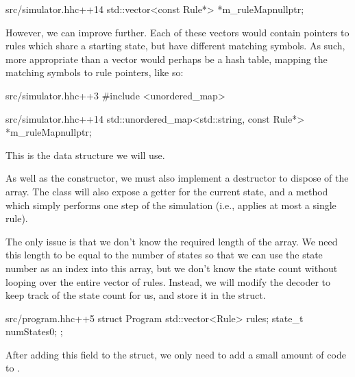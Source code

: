 \begin{file}{src/simulator.hh}{c++}{14}
    std::vector<const Rule*> *m_ruleMap{nullptr};
\end{file}

However, we can improve further. Each of these vectors would contain pointers to rules which share a starting state, but have different matching symbols. As such, more appropriate than a vector would perhaps be a hash table, mapping the matching symbols to rule pointers, like so:

\begin{file}{src/simulator.hh}{c++}{3}
#include <unordered_map>
\end{file}

\begin{file}{src/simulator.hh}{c++}{14}
    std::unordered_map<std::string, const Rule*> *m_ruleMap{nullptr};
\end{file}

This is the data structure we will use.

As well as the constructor, we must also implement a destructor to dispose of the  array. The class will also expose a getter for the current state, and a method which simply performs one step of the simulation (i.e., applies at most a single rule).

\begin{file}{src/simulator.hh}{c++}{16}
public:
    Simulator(std::unique_ptr<Program>, Tape &);
    ~Simulator();

    inline state_t getState(void) const { return m_state; };
    bool step(void);
};
\end{file}

The only issue is that we don't know the required length of the  array. We need this length to be equal to the number of states so that we can use the state number as an index into this array, but we don't know the state count without looping over the entire vector of rules. Instead, we will modify the decoder to keep track of the state count for us, and store it in the  struct.

\begin{file}{src/program.hh}{c++}{5}
struct Program
{
    std::vector<Rule> rules;
    state_t numStates{0};
};
\end{file}

After adding this field to the  struct, we only need to add a small amount of code to .

